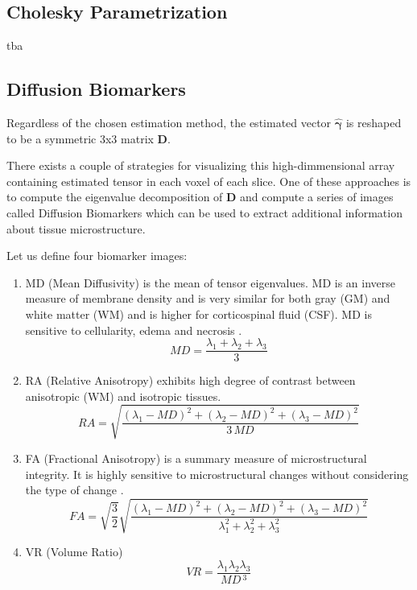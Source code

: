 \hfill
\subsection{Cholesky Parametrization}

tba

\hfill
\subsection{Diffusion Biomarkers}

Regardless of the chosen estimation method, the estimated vector $\boldsymbol{\hat{\gamma}}$ is reshaped to be a \vbox{symmetric 3x3 matrix $\boldsymbol{D}$}. 

There exists a couple of strategies for visualizing this high-dimmensional
array containing estimated tensor in each voxel of each slice. One of these approaches is to compute the eigenvalue decomposition of $\boldsymbol{D}$ and
compute a series of images called Diffusion Biomarkers which can be used to extract additional information about tissue microstructure. 

Let us define four biomarker images: 
\begin{enumerate}
	\item MD (Mean Diffusivity) is the mean of tensor eigenvalues. MD is an
	inverse measure of membrane density and is very similar for both gray
	(GM) and white matter (WM) and is higher for corticospinal fluid (CSF).
	MD is sensitive to cellularity, edema and necrosis \cite{m6_basser2002}. 
	\begin{equation}
	MD = \dfrac{\lambda_{1}+\lambda_{2}+\lambda_{3}}{3}
	\label{Eq:m6_eq_23}
	\end{equation}
	
	\item RA (Relative Anisotropy) exhibits high degree of contrast between
	anisotropic (WM) and isotropic tissues. 
	\begin{equation}
	RA = \sqrt{\dfrac{\left(\lambda_{1}-MD\right)^2+\left(\lambda_{2}-MD\right)^2+\left(\lambda_{3}-MD\right)^2}{3\,MD}}
	\label{Eq:m6_eq_24}
	\end{equation}
	
	\item FA (Fractional Anisotropy) is a summary measure of microstructural
	integrity. It is highly sensitive to microstructural changes without
	considering the type of change \cite{m6_soares2013}. 
	\begin{equation}
	FA = \sqrt{\dfrac{3}{2}}\sqrt{\dfrac{\left(\lambda_{1}-MD\right)^2+\left(\lambda_{2}-MD\right)^2+\left(\lambda_{3}-MD\right)^2}{\lambda_{1}^2+\lambda_{2}^2+\lambda_{3}^2}}
	\label{Eq:m6_eq_25}
	\end{equation}
	
	\item VR (Volume Ratio) 
	\begin{equation}
	VR = \frac{\lambda_{1}\lambda_{2}\lambda_{3}}{MD\,^3}
	\label{Eq:m6_eq_26}
	\end{equation}
\end{enumerate}

